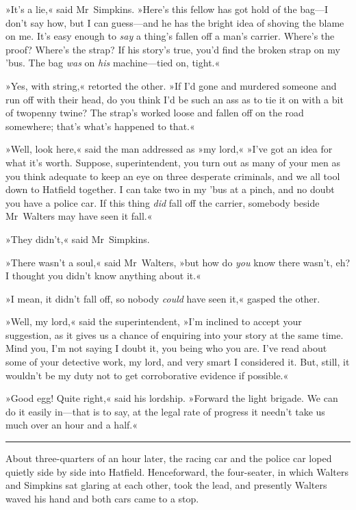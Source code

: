 »It's a lie,« said Mr~Simpkins. »Here's this fellow has got hold of the bag—I don't say how, but I can guess—and he has the bright idea of shoving the blame on me. It's easy enough to \textit{say} a thing's fallen off a man's carrier. Where's the proof? Where's the strap? If his story's true, you'd find the broken strap on my 'bus. The bag \textit{was} on \textit{his} machine—tied on, tight.«

»Yes, with string,« retorted the other. »If I'd gone and murdered someone and run off with their head, do you think I'd be such an ass as to tie it on with a bit of twopenny twine? The strap's worked loose and fallen off on the road somewhere; that's what's happened to that.«

»Well, look here,« said the man addressed as »my lord,« »I've got an idea for what it's worth. Suppose, superintendent, you turn out as many of your men as you think adequate to keep an eye on three desperate criminals, and we all tool down to Hatfield together. I can take two in my 'bus at a pinch, and no doubt you have a police car. If this thing \textit{did} fall off the carrier, somebody beside Mr~Walters may have seen it fall.«

»They didn't,« said Mr~Simpkins.

»There wasn't a soul,« said Mr~Walters, »but how do \textit{you} know there wasn't, eh? I thought you didn't know anything about it.«

»I mean, it didn't fall off, so nobody \textit{could} have seen it,« gasped the other.

»Well, my lord,« said the superintendent, »I'm inclined to accept your suggestion, as it gives us a chance of enquiring into your story at the same time. Mind you, I'm not saying I doubt it, you being who you are. I've read about some of your detective work, my lord, and very smart I considered it. But, still, it wouldn't be my duty not to get corroborative evidence if possible.«

»Good egg! Quite right,« said his lordship. »Forward the light brigade. We can do it easily in—that is to say, at the legal rate of progress it needn't take us much over an hour and a half.«

\noindent\hfil\rule{0.5\textwidth}{.4pt}\hfil 

About three-quarters of an hour later, the racing car and the police car loped quietly side by side into Hatfield. Henceforward, the four-seater, in which Walters and Simpkins sat glaring at each other, took the lead, and presently Walters waved his hand and both cars came to a stop.

